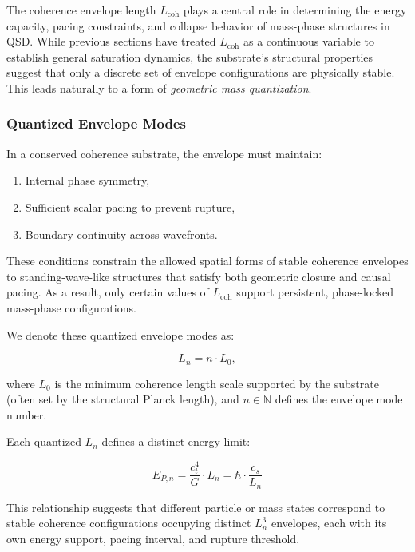 \documentclass[entropy,article,submit,pdftex,moreauthors]{Definitions/mdpi}
\begin{document}
The coherence envelope length $L_{\text{coh}}$ plays a central role in determining the energy capacity, pacing constraints, and collapse behavior of mass-phase structures in QSD. While previous sections have treated $L_{\text{coh}}$ as a continuous variable to establish general saturation dynamics, the substrate’s structural properties suggest that only a discrete set of envelope configurations are physically stable. This leads naturally to a form of \textit{geometric mass quantization}.


\subsubsection{Quantized Envelope Modes}

In a conserved coherence substrate, the envelope must maintain:
\begin{enumerate}
  \item Internal phase symmetry,
  \item Sufficient scalar pacing to prevent rupture,
  \item Boundary continuity across wavefronts.
\end{enumerate}

These conditions constrain the allowed spatial forms of stable coherence envelopes to standing-wave-like structures that satisfy both geometric closure and causal pacing. As a result, only certain values of $L_{\text{coh}}$ support persistent, phase-locked mass-phase configurations.

We denote these quantized envelope modes as:

\begin{equation}
L_n = n \cdot L_0,
\end{equation}

where $L_0$ is the minimum coherence length scale supported by the substrate (often set by the structural Planck length), and $n \in \mathbb{N}$ defines the envelope mode number.

Each quantized $L_n$ defines a distinct energy limit:

\begin{equation}
E_{P,n} = \frac{c_t^4}{G} \cdot L_n = \hbar \cdot \frac{c_s}{L_n}
\end{equation}

This relationship suggests that different particle or mass states correspond to stable coherence configurations occupying distinct $L_n^3$ envelopes, each with its own energy support, pacing interval, and rupture threshold.
\end{document}
